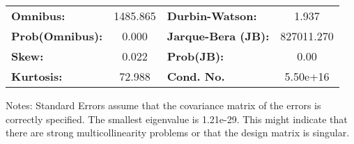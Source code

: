 \begin{center}
\begin{tabular}{lcccccc}
\bottomrule
\end{tabular}
\begin{tabular}{lclc}
\textbf{Omnibus:}       & 1485.865 & \textbf{  Durbin-Watson:     } &     1.937   \\
\textbf{Prob(Omnibus):} &   0.000  & \textbf{  Jarque-Bera (JB):  } & 827011.270  \\
\textbf{Skew:}          &   0.022  & \textbf{  Prob(JB):          } &      0.00   \\
\textbf{Kurtosis:}      &  72.988  & \textbf{  Cond. No.          } &  5.50e+16   \\
\bottomrule
\end{tabular}
\end{center}

Notes: \newline
 [1] Standard Errors assume that the covariance matrix of the errors is correctly specified. \newline
 [2] The smallest eigenvalue is 1.21e-29. This might indicate that there are \newline
 strong multicollinearity problems or that the design matrix is singular.